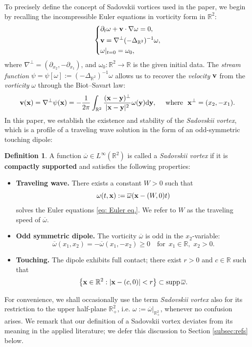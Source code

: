 \documentclass[11pt]{amsart}
\theoremstyle{definition}
\newtheorem{definition}[theorem]{Definition}
\theoremstyle{definition}
\numberwithin{equation}{section}
\newcommand{\supp}{{\mathrm{supp}}\,}
\newcommand{\0}{\emptyset}
\newcommand{\omg}{\omega}
\newcommand{\bfv}{{\bf v}}
\newcommand{\bfx}{{\bf x}}
\newcommand{\bfy}{{\bf y}}
\newcommand{\bbR}{\mathbb R}
\newcommand{\dd}{\mathrm{d}}
\begin{document}
	
	To precisely define the concept of Sadovskii vortices used in the paper, we begin by recalling the incompressible Euler equations in vorticity form in $\bbR^2$: 
	\begin{equation}\label{eq: Euler eq.}
		\left\{
		\begin{aligned}
			&\partial_{t} \omega + \bfv \cdot \nabla \omega = 0,\\
			&\bfv=\nabla^\perp(-\Delta_{\bbR^2})^{-1}\omega,\\
			&\omega|_{t=0} = \omega_{0},
		\end{aligned}
		\right.
	\end{equation} where $\nabla^\perp = (\partial_{x_2}, -\partial_{x_1})$, and $\omg_0:\bbR^2\to\bbR$ is the  given initial data. The \textit{stream function} $\psi=\psi[\omg]:=(-\Delta_{\bbR^2})^{-1}\omega$ allows us to recover the \textit{velocity} $\bfv$ from the \textit{vorticity} $\omega$ through the Biot--Savart law:
	$$
	\bfv(\bfx)  = \nabla^\perp \psi(\bfx) = -\frac{1}{2\pi} \int_{\bbR^2}\frac{(\bfx-\bfy)^\perp}{|\bfx-\bfy|^2}\omega(\bfy)  \dd \bfy, \quad \mbox{ where }\,\, \bfx^\perp=(x_2,-x_1).
	$$
	In this paper, we establish the existence and stability of the \textit{Sadovskii vortex}, which is a profile of a traveling wave solution in the form of an odd-symmetric touching dipole:
	
	
	
	\begin{definition}\label{def: Sadovskii vortex}
		A function $\overline{\omega} \in L^\infty(\bbR^2)$ is called a \textit{Sadovskii vortex} if it is \textbf{compactly supported} and satisfies the following properties:
		\begin{itemize}[itemsep=1em, topsep=1em]
			\item[(i)] \textbf{Traveling wave.} 
			There exists a constant $W > 0$ such that  
			\[
			\omega(t, \bfx) := \overline{\omega}(\bfx - (W, 0)t)
			\]
			solves the Euler equations \eqref{eq: Euler eq.}.  
			We refer to $W$ as the traveling speed of $\overline{\omega}$.
			
			\item[(ii)] \textbf{Odd symmetric dipole.}
			The vorticity $\overline{\omega}$ is odd in the $x_2$-variable:
			\[
			\overline{\omega}(x_1, x_2) = -\overline{\omega}(x_1, -x_2) \geq 0 
			\quad \mbox{for }\, x_1 \in \bbR, \,\, x_2 > 0.
			\]
			
			\item[(iii)] \textbf{Touching.} The dipole exhibits full contact; there exist $r > 0$ and $c \in \bbR$ such that  
			\begin{equation}\label{touching_scale}
			\left\{ \bfx \in \bbR^2 : |\bfx - (c, 0)| < r \right\} \subset \supp \overline{\omega}.
			\end{equation}
		\end{itemize}
	\end{definition}
	For convenience, we shall occasionally use the term \emph{Sadovskii vortex} also for its restriction to the upper half-plane $\mathbb{R}^2_+$, i.e. $\omega := \overline{\omega}|_{\bbR^2_+}$, whenever no confusion arises.
	We remark that our definition of a Sadovskii vortex deviates from its meaning in the applied literature; we defer this discussion to Section \ref{subsec:refs} below.
	
\end{document}
